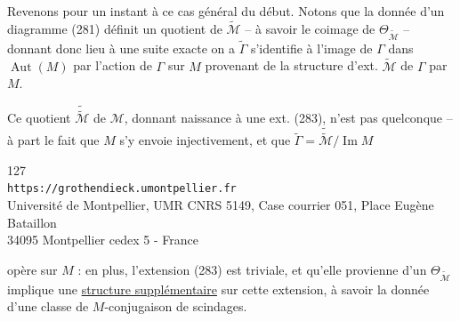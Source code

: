 Revenons pour un instant à ce cas général du début. Notons que la donnée d'un diagramme (281)  définit un quotient  de $\widetilde{\mathcal M}$ -- à savoir le coimage de $\Theta_{\widetilde{\mathcal M}}$ --   donnant donc lieu à une suite  exacte
 on a
$\widetilde\Gamma$ s'identifie à l'image de $\Gamma$ dans $\operatorname{Aut}(M)$ par l'action de $\Gamma$ sur $M$ provenant de la structure d'ext. $\widetilde{\mathcal M}$ de $\Gamma$ par $M$.

 Ce quotient $\widetilde{\widetilde{\mathcal M}}$ de $\mathcal M$, donnant naissance à une ext. (283), n'est pas quelconque -- à part le fait que $M$ s'y envoie injectivement, et que $\widetilde\Gamma=\widetilde{\widetilde{\mathcal M}}/\operatorname{Im}M$


\begin{center}
\small
127\\
\texttt{https://grothendieck.umontpellier.fr}\\
Université de Montpellier, UMR CNRS 5149, Case courrier 051, Place Eugène Bataillon\\
34095 Montpellier cedex 5 - France
\end{center}


opère   sur $M$ : en plus, l'extension (283) est triviale, et   qu'elle provienne d'un $\Theta_{\widetilde{\mathcal M}}$ implique une \uline{structure supplémentaire} sur cette extension, à savoir la donnée d'une classe de $M$-conjugaison de scindages.

